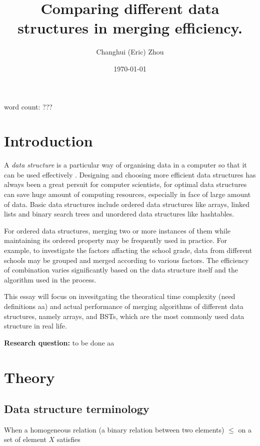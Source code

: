 \documentclass[12pt]{article}
\title{\textbf{Comparing different data structures in merging efficiency.}}
\author{Changhui (Eric) Zhou}
\date{\today}
\begin{document}
\begin{titlepage}
    \maketitle
    \centering word count: ???
\end{titlepage}

\tableofcontents
\clearpage

\section{Introduction}

A \textit{data structure} is a particular way of organising data in a computer so that it can be used effectively \cite{geeksforgeeks_data_structures}. Designing and choosing more efficient data structures has always been a great persuit for computer scientists, for optimal data structures can save huge amount of computing resources, especially in face of large amount of data. Basic data structures include ordered data structures like arrays, linked lists and binary search trees and unordered data structures like hashtables. 

For ordered data structures, merging two or more instances of them while maintaining its ordered property may be frequently used in practice. For example, to investigate the factors affacting the school grade, data from different schools may be grouped and merged according to various factors. The efficiency of combination varies significantly based on the data structure itself and the algorithm used in the process. 

This essay will focus on invesitgating the theoratical time complexity (need definitions aa) and actual performance of merging algorithms of different data structures, namely arrays, and BSTs, which are the most commonly used data structure in real life. 

\textbf{Research question:} to be done aa

\section{Theory}

\subsection{Data structure terminology}

When a homogeneous relation (a binary relation between two elements) $\le$ on a set of element $X$ satisfies
\end{document}
